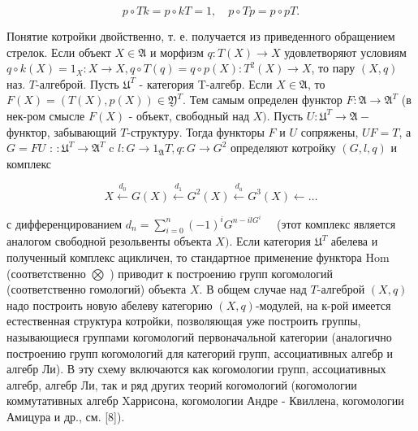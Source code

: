 \documentclass[10pt]{article}
\begin{document}
\[

p \circ T k=p \circ k T=1, \quad p \circ T p=p \circ p T .

\]



Понятие котройки двойственно, т. е. получается из приведенного обращением стрелок. Если объект $X \in \mathfrak{A}$ и морфизм $q: T(X) \rightarrow X$ удовлетворяют условиям $q \circ k(X)=1_{X}: X \rightarrow X, q \circ T(q)=q \circ p(X): T^{2}(X) \rightarrow X$, то пару $(X, q)$ наз. $T$-алгеброй. Пусть $\mathfrak{U}^{T}$ - категория T-алгебр. Если $X \in \mathfrak{A}$, то $F(X)=(T(X), p(X)) \in \mathfrak{Y}^{T}$. Тем самым определен функтор $F: \mathfrak{A} \rightarrow \mathfrak{A}^{T}$ (в нек-ром смысле $F(X)$ - объект, свободный над $X)$. Пусть $U: \mathfrak{U}^{T} \rightarrow \mathfrak{A}-$ функтор, забывающий $T$-структуру. Тогда функторы $F$ и $U$ сопряжены, $U F=T$, а $G=F U$ : $: \mathfrak{U}^{T} \rightarrow \mathfrak{A}^{T}$ c $l: G \rightarrow 1_{\mathfrak{A}} T, q: G \rightarrow G^{2}$ определяют котройку $(G, l, q)$ и комплекс



\[

X \stackrel{d_{0}}{\longleftarrow} G(X) \stackrel{d_{1}}{\longleftarrow} G^{2}(X) \stackrel{d_{a}}{\longleftarrow} G^{3}(X) \longleftarrow \ldots

\]



с дифференцированием $d_{n}=\sum_{i=0}^{n}(-1)^{i} G^{n-i l G^{i}} \quad$ (этот комплекс является аналогом свободной резольвенты объекта $X)$. Если категория $\mathfrak{U}^{T}$ абелева и полученный комплекс ацикличен, то стандартное применение функтора Hom (соответственно $\bigotimes$ ) приводит к построению групп когомологий (соответственно гомологий) объекта $X$. В общем случае над $T$-алгеброй $(X, q)$ надо построить новую абелеву категорию $(X, q)$-модулей, на к-рой имеется естественная структура котройки, позволяющая уже построить группы, называющиеся группами когомологий первоначальной категории (аналогично построению групп когомологий для категорий групп, ассоциативных алгебр и алгебр Ли). В эту схему включаются как когомологии групп, ассоциативных алгебр, алгебр Ли, так и ряд других теорий когомологий (когомологии коммутативных алгебр Xаррисона, когомологии Андре - Квиллена, когомологии Амицура и др., см. [8]).
\end{document}

